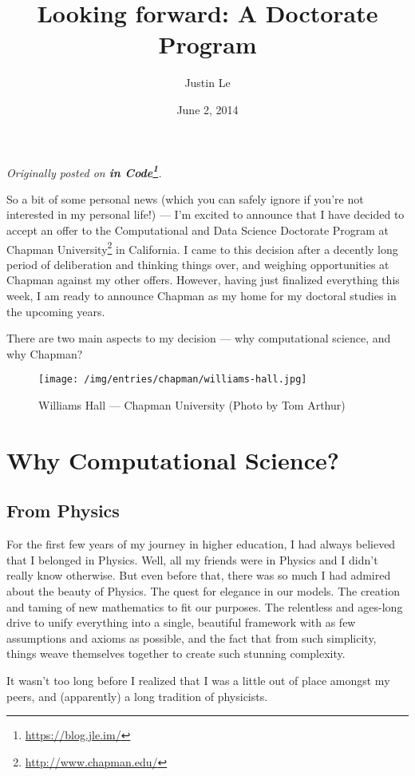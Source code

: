 \documentclass[]{article}
\title{Looking forward: A Doctorate Program}
\author{Justin Le}
\date{June 2, 2014}
\renewcommand{\href}[2]{#2\footnote{\url{#1}}}
\begin{document}
\maketitle

\emph{Originally posted on \textbf{\href{https://blog.jle.im/}{in
Code}}.}

So a bit of some personal news (which you can safely ignore if you're
not interested in my personal life!) --- I'm excited to announce that I
have decided to accept an offer to the Computational and Data Science
Doctorate Program at \href{http://www.chapman.edu/}{Chapman University}
in California. I came to this decision after a decently long period of
deliberation and thinking things over, and weighing opportunities at
Chapman against my other offers. However, having just finalized
everything this week, I am ready to announce Chapman as my home for my
doctoral studies in the upcoming years.

There are two main aspects to my decision --- why computational science,
and why Chapman?

\begin{figure}[htbp]
\centering
\texttt{[image: /img/entries/chapman/williams-hall.jpg]}
\caption{Williams Hall --- Chapman University (Photo by Tom Arthur)}
\end{figure}

\section{Why Computational Science?}\label{why-computational-science}

\subsection{From Physics}\label{from-physics}

For the first few years of my journey in higher education, I had always
believed that I belonged in Physics. Well, all my friends were in
Physics and I didn't really know otherwise. But even before that, there
was so much I had admired about the beauty of Physics. The quest for
elegance in our models. The creation and taming of new mathematics to
fit our purposes. The relentless and ages-long drive to unify everything
into a single, beautiful framework with as few assumptions and axioms as
possible, and the fact that from such simplicity, things weave
themselves together to create such stunning complexity.

It wasn't too long before I realized that I was a little out of place
amongst my peers, and (apparently) a long tradition of physicists.
\end{document}
